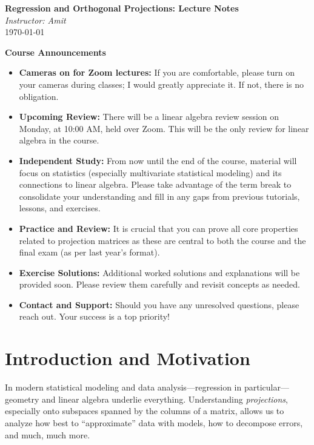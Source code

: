 \documentclass[11pt,a4paper]{article}
\theoremstyle{definition}
\theoremstyle{plain}
\theoremstyle{remark}
\begin{document}
\begin{center}
    {\Large\bfseries Regression and Orthogonal Projections: Lecture Notes} \\[1ex]
    \emph{Instructor: Amit} \\
    \today
\end{center}

\begin{administrative}
\textbf{Course Announcements}
\begin{itemize}
  \item\textbf{Cameras on for Zoom lectures:} If you are comfortable, please turn on your cameras during classes; I would greatly appreciate it. If not, there is no obligation.
  \item\textbf{Upcoming Review:} There will be a linear algebra review session on Monday, at 10:00 AM, held over Zoom. This will be the only review for linear algebra in the course.
  \item\textbf{Independent Study:} From now until the end of the course, material will focus on statistics (especially multivariate statistical modeling) and its connections to linear algebra. Please take advantage of the term break to consolidate your understanding and fill in any gaps from previous tutorials, lessons, and exercises.
  \item\textbf{Practice and Review:} It is crucial that you can prove all core properties related to projection matrices as these are central to both the course and the final exam (as per last year's format).
  \item\textbf{Exercise Solutions:} Additional worked solutions and explanations will be provided soon. Please review them carefully and revisit concepts as needed.
  \item\textbf{Contact and Support:} Should you have any unresolved questions, please reach out. Your success is a top priority!
\end{itemize}
\end{administrative}

\tableofcontents

\section{Introduction and Motivation}

In modern statistical modeling and data analysis—regression in particular—geometry and linear algebra underlie everything. Understanding \emph{projections}, especially onto subspaces spanned by the columns of a matrix, allows us to analyze how best to ``approximate'' data with models, how to decompose errors, and much, much more.
\end{document}
